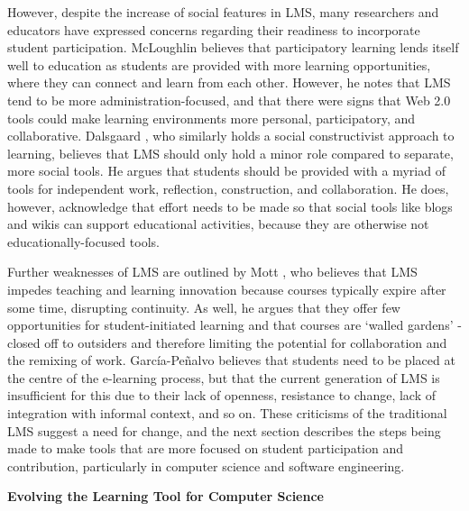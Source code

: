 \begin{itemize}
However, despite the increase of social features in LMS, many researchers and educators have expressed concerns regarding their readiness to incorporate student participation. McLoughlin \cite{mcloughlin2007social} believes that participatory learning lends itself well to education as students are provided with more learning opportunities, where they can connect and learn from each other. However, he notes that LMS tend to be more administration-focused, and that there were signs that Web 2.0 tools could make learning environments more personal, participatory, and collaborative. Dalsgaard \cite{dalsgaard2006social}, who similarly holds a social constructivist approach to learning, believes that LMS should only hold a minor role compared to separate, more social tools. He argues that students should be provided with a myriad of tools for independent work, reflection, construction, and collaboration. He does, however, acknowledge that effort needs to be made so that social tools like blogs and wikis can support educational activities, because they are otherwise not educationally-focused tools.

Further weaknesses of LMS are outlined by Mott \cite{mott2010envisioning}, who believes that LMS impedes teaching and learning innovation because courses typically expire after some time, disrupting continuity. As well, he argues that they offer few opportunities for student-initiated learning and that courses are `walled gardens' - closed off to outsiders and therefore limiting the potential for collaboration and the remixing of work. García-Peñalvo \cite{garcia2011opening} believes that students need to be placed at the centre of the e-learning process, but that the current generation of LMS is insufficient for this due to their lack of openness, resistance to change, lack of integration with informal context, and so on. These criticisms of the traditional LMS suggest a need for change, and the next section describes the steps being made to make tools that are more focused on student participation and contribution, particularly in computer science and software engineering.

\textbf{Evolving the Learning Tool for Computer Science} \\


\end{itemize}
